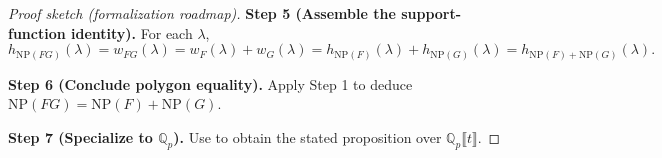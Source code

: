 \begin{proof}[Proof sketch (formalization roadmap)]
  \textbf{Step 5 (Assemble the support-function identity).}
  For each $\lambda$,
  \[
    h_{\mathrm{NP}(FG)}(\lambda)=w_{FG}(\lambda)=w_F(\lambda)+w_G(\lambda)
    =h_{\mathrm{NP}(F)}(\lambda)+h_{\mathrm{NP}(G)}(\lambda)
    =h_{\mathrm{NP}(F)+\mathrm{NP}(G)}(\lambda).
  \]

  \textbf{Step 6 (Conclude polygon equality).}
  Apply Step 1 to deduce $\mathrm{NP}(FG)=\mathrm{NP}(F)+\mathrm{NP}(G)$.

  \textbf{Step 7 (Specialize to $\mathbb{Q}_p$).}
  Use  to obtain the stated proposition over $\mathbb{Q}_p\llbracket t\rrbracket$.
\end{proof}
